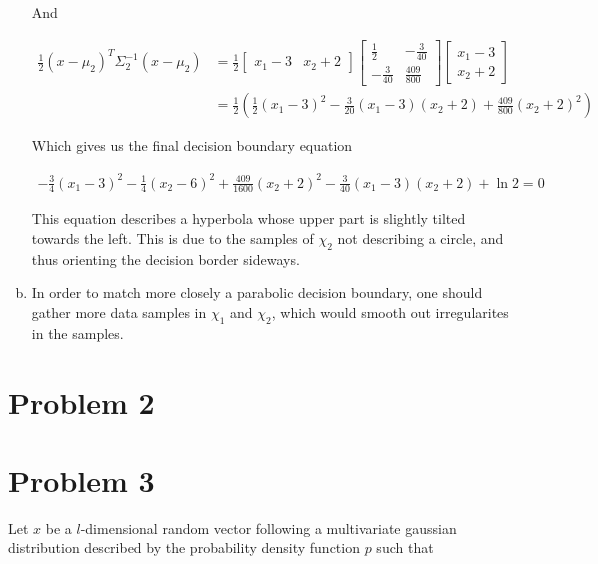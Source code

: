 \documentclass[a4paper, 10pt, twoside]{article}
\begin{document}
\begin{enumerate}[a)]
          And

          \begin{align*}
              \frac{1}{2} (x - \mu_2)^T \Sigma_2^{-1}(x - \mu_2)
               & =
              \frac{1}{2}
              \begin{bmatrix}x_1-3 & x_2+2\end{bmatrix}
              \begin{bmatrix}\frac{1}{2} & -\frac{3}{40} \\ -\frac{3}{40} & \frac{409}{800}\end{bmatrix}
              \begin{bmatrix}x_1-3 \\ x_2+2\end{bmatrix} \\
               & =
              \frac{1}{2}\left(\frac{1}{2}(x_1-3)^2 - \frac{3}{20}(x_1-3)(x_2+2)+\frac{409}{800}(x_2+2)^2\right)
          \end{align*}

          Which gives us the final decision boundary equation

          \begin{align*}
              -\frac{3}{4} (x_1-3)^2 - \frac{1}{4} (x_2-6)^2 + \frac{409}{1600} (x_2+2)^2 - \frac{3}{40} (x_1-3)(x_2+2) + \ln 2 = 0
          \end{align*}

          This equation describes a hyperbola whose upper part is slightly tilted towards the left. This is due to the samples of $\chi_2$ not describing a circle, and thus orienting the decision border sideways.

    \item In order to match more closely a parabolic decision boundary, one should gather more data samples in $\chi_1$ and $\chi_2$, which would smooth out irregularites in the samples.

\end{enumerate}

\section*{Problem 2}

\section*{Problem 3}
Let $x$ be a $l$-dimensional random vector following a multivariate gaussian distribution described by the probability density function $p$ such that
\end{document}
